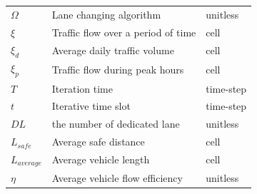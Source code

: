 \begin{table}[H]
\begin{tabular}{lll}
		\\
		$\Omega  $                                & Lane changing algorithm                               & unitless                                   \\
		$\xi$                                     & Traffic flow over a period of time                    & cell                                       \\
		${\xi _d}$                                & Average daily traffic volume                          & cell                                       \\
		${\xi _p}$                                & Traffic flow during peak hours                        & cell                                       \\
		$T$                                       & Iteration time                                        & time-step                                  \\
		$t$                                       & Iterative time slot                                   & time-step                                  \\
		$DL$                                      & the number of dedicated lane                          & unitless                                   \\
		$ L_{safe}$                               & Average safe distance                                 & cell                                       \\
		$ L_{average}$                            & Average vehicle length                                & cell                                       \\
		$\eta$                                    & Average vehicle flow efficiency                       & unitless                                   \\
		\bottomrule
	\end{tabular}
\end{table}

